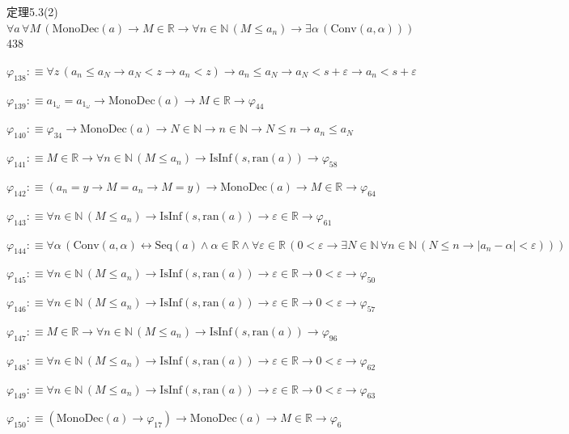 \begin{fullproof}{定理5.3(2)}{$\forall a\,\forall M\,(\mathrm{MonoDec}(a) \to M \in \mathbb{R} \to \forall n \in \mathbb{N}\,(M \leq a_{n}) \to \exists \alpha\,(\mathrm{Conv}(a,\alpha)))$}{438}
\begin{abbrevlist}
\item $\varphi_{138} :\equiv \forall z\,(a_{n} \leq a_{N} \to a_{N} < z \to a_{n} < z) \to a_{n} \leq a_{N} \to a_{N} < s + \varepsilon \to a_{n} < s + \varepsilon$
\item $\varphi_{139} :\equiv a_{1_{\omega}} = a_{1_{\omega}} \to \mathrm{MonoDec}(a) \to M \in \mathbb{R} \to \varphi_{44}$
\item $\varphi_{140} :\equiv \varphi_{34} \to \mathrm{MonoDec}(a) \to N \in \mathbb{N} \to n \in \mathbb{N} \to N \leq n \to a_{n} \leq a_{N}$
\item $\varphi_{141} :\equiv M \in \mathbb{R} \to \forall n \in \mathbb{N}\,(M \leq a_{n}) \to \mathrm{IsInf}(s,\mathrm{ran}(a)) \to \varphi_{58}$
\item $\varphi_{142} :\equiv (a_{n} = y \to M = a_{n} \to M = y) \to \mathrm{MonoDec}(a) \to M \in \mathbb{R} \to \varphi_{64}$
\item $\varphi_{143} :\equiv \forall n \in \mathbb{N}\,(M \leq a_{n}) \to \mathrm{IsInf}(s,\mathrm{ran}(a)) \to \varepsilon \in \mathbb{R} \to \varphi_{61}$
\item $\varphi_{144} :\equiv \forall \alpha\,(\mathrm{Conv}(a,\alpha) \leftrightarrow \mathrm{Seq}(a) \land \alpha \in \mathbb{R} \land \forall \varepsilon \in \mathbb{R}\,(0 < \varepsilon \to \exists N \in \mathbb{N}\,\forall n \in \mathbb{N}\,(N \leq n \to \lvert a_{n} - \alpha \rvert < \varepsilon)))$
\item $\varphi_{145} :\equiv \forall n \in \mathbb{N}\,(M \leq a_{n}) \to \mathrm{IsInf}(s,\mathrm{ran}(a)) \to \varepsilon \in \mathbb{R} \to 0 < \varepsilon \to \varphi_{50}$
\item $\varphi_{146} :\equiv \forall n \in \mathbb{N}\,(M \leq a_{n}) \to \mathrm{IsInf}(s,\mathrm{ran}(a)) \to \varepsilon \in \mathbb{R} \to 0 < \varepsilon \to \varphi_{57}$
\item $\varphi_{147} :\equiv M \in \mathbb{R} \to \forall n \in \mathbb{N}\,(M \leq a_{n}) \to \mathrm{IsInf}(s,\mathrm{ran}(a)) \to \varphi_{96}$
\item $\varphi_{148} :\equiv \forall n \in \mathbb{N}\,(M \leq a_{n}) \to \mathrm{IsInf}(s,\mathrm{ran}(a)) \to \varepsilon \in \mathbb{R} \to 0 < \varepsilon \to \varphi_{62}$
\item $\varphi_{149} :\equiv \forall n \in \mathbb{N}\,(M \leq a_{n}) \to \mathrm{IsInf}(s,\mathrm{ran}(a)) \to \varepsilon \in \mathbb{R} \to 0 < \varepsilon \to \varphi_{63}$
\item $\varphi_{150} :\equiv (\mathrm{MonoDec}(a) \to \varphi_{17}) \to \mathrm{MonoDec}(a) \to M \in \mathbb{R} \to \varphi_{6}$

\end{abbrevlist}
\end{fullproof}
